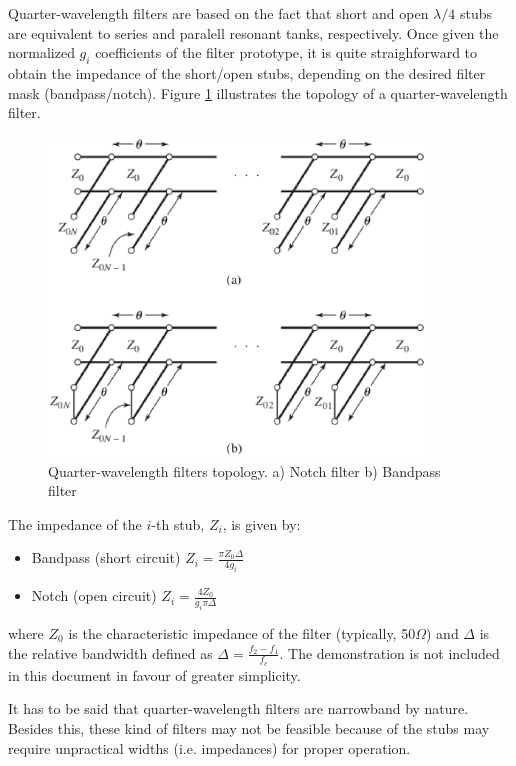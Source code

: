 Quarter-wavelength filters are based on the fact that short and open $\lambda/4$ stubs are equivalent to series and paralell resonant tanks, respectively. Once given the normalized $g_i$ coefficients of the filter prototype, it is quite straighforward to obtain the impedance of the short/open stubs, depending on the desired filter mask (bandpass/notch). Figure \ref{eq:QWfilter} illustrates the topology of a quarter-wavelength filter.\\

\begin{figure}[h!]
\centering
\includegraphics[width=100mm]{QuarterWavelengthFilter}
\caption{Quarter-wavelength filters topology. a) Notch filter b) Bandpass filter \cite{Pozar}}
\label{eq:QWfilter}
\end{figure}

\noindent The impedance of the $i$-th stub, $Z_i$, is given by:

\begin{itemize}
\item{Bandpass (short circuit)} $Z_i = \frac{\pi Z_0 \Delta}{4g_i}$
\item{Notch (open circuit)} $Z_i = \frac{4 Z_0 }{g_i\pi \Delta}$
\end{itemize}

\noindent where $Z_0$ is the characteristic impedance of the filter (typically, 50$\Omega$) and $\Delta$ is the relative bandwidth defined as $\Delta = \frac{f_2 - f_1}{f_c}$. The demonstration \cite{Pozar} is not included in this document in favour of greater simplicity.

\noindent It has to be said that quarter-wavelength filters are narrowband by nature. Besides this, these kind of filters may not be feasible because of the stubs may require unpractical widths (i.e. impedances) for proper operation.



